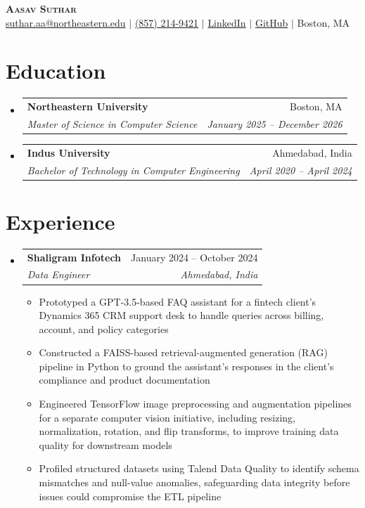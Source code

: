 \documentclass[letterpaper,11pt]{article}
\makeatletter
\newcommand{\resumeItem}[1]{
  \item\small{
    {#1 \vspace{-3pt}}
  }
}
\newcommand{\resumeSubheading}[4]{
  \vspace{-1pt}\item
    \begin{tabular*}{0.97\textwidth}[t]{l@{\extracolsep{\fill}}r}
      \textbf{#1} & #2 \\
      \textit{\small#3} & \textit{\small #4} \\
    \end{tabular*}\vspace{-6pt}
}
\newcommand{\resumeSubHeadingListStart}{\begin{itemize}[leftmargin=0.15in, label={}, itemsep=0pt]}
\newcommand{\resumeSubHeadingListEnd}{\end{itemize}\vspace{-4pt}}
\newcommand{\resumeItemListStart}{\begin{itemize}[itemsep=-1pt, topsep=1pt]}
\newcommand{\resumeItemListEnd}{\end{itemize}\vspace{-4pt}}
\makeatother
\begin{document}
\begin{center}
    \textbf{\Huge \scshape Aasav Suthar} \\ \vspace{1pt}
    \small 
    \textcolor{blue}{\href{mailto:suthar.aa@northeastern.edu}{{suthar.aa@northeastern.edu}}} $|$ 
    \textcolor{blue}{\href{tel:+18572149421}{(857) 214-9421}} $|$
    \textcolor{blue}{\href{https://linkedin.com/in/aasavsuthar}{LinkedIn}} $|$
    \textcolor{blue}{\href{https://github.com/savsuth}{GitHub}}
      $|$ Boston, MA
\end{center}
\vspace{-8pt}

\section{Education}
  \resumeSubHeadingListStart
    \resumeSubheading
      {Northeastern University}{Boston, MA}
      {Master of Science in Computer Science}{January 2025 -- December 2026}
    \resumeSubheading
      {Indus University}{Ahmedabad, India}
      {Bachelor of Technology in Computer Engineering}{April 2020 -- April 2024}
  \resumeSubHeadingListEnd

\section{Experience}
  \resumeSubHeadingListStart

  \resumeSubheading
      {Shaligram Infotech}{January 2024 -- October 2024}
      {Data Engineer}{Ahmedabad, India}
      \resumeItemListStart
        \resumeItem{Prototyped a GPT-3.5-based FAQ assistant for a fintech client's Dynamics 365 CRM support desk to handle queries across billing, account, and policy categories}
        \resumeItem{Constructed a FAISS-based retrieval-augmented generation (RAG) pipeline in Python to ground the assistant's responses in the client's compliance and product documentation}
        \resumeItem{Engineered TensorFlow image preprocessing and augmentation pipelines for a separate computer vision initiative, including resizing, normalization, rotation, and flip transforms, to improve training data quality for downstream models}
        \resumeItem{Profiled structured datasets using Talend Data Quality to identify schema mismatches and null-value anomalies, safeguarding data integrity before issues could compromise the ETL pipeline}
      \resumeItemListEnd

  \resumeSubHeadingListEnd
\end{document}
